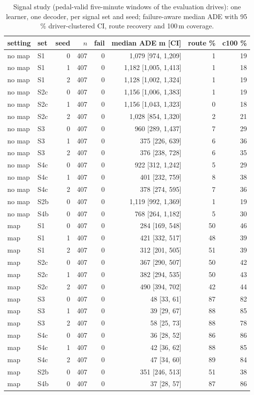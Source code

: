 \begin{table}[t]\centering\scriptsize\setlength{\tabcolsep}{3pt}
\caption{Signal study (pedal-valid five-minute windows of the evaluation drives): one learner, one decoder, per signal set and seed; failure-aware median ADE with 95\,\% driver-clustered CI, route recovery and 100\,m coverage.}\label{tab:supp_signal_sets}
\begin{tabular}{llrrrrrr}\toprule
setting & set & seed & $n$ & fail & median ADE m [CI] & route \% & c100 \% \\\midrule
no map & S1 & 0 & 407 & 0 & 1{,}079 [974, 1{,}209] & 1 & 19 \\
no map & S1 & 1 & 407 & 0 & 1{,}182 [1{,}005, 1{,}413] & 1 & 18 \\
no map & S1 & 2 & 407 & 0 & 1{,}128 [1{,}002, 1{,}324] & 1 & 19 \\
no map & S2c & 0 & 407 & 0 & 1{,}156 [1{,}006, 1{,}383] & 1 & 19 \\
no map & S2c & 1 & 407 & 0 & 1{,}156 [1{,}043, 1{,}323] & 0 & 18 \\
no map & S2c & 2 & 407 & 0 & 1{,}028 [854, 1{,}320] & 2 & 21 \\
no map & S3 & 0 & 407 & 0 & 960 [289, 1{,}437] & 7 & 29 \\
no map & S3 & 1 & 407 & 0 & 375 [226, 639] & 6 & 36 \\
no map & S3 & 2 & 407 & 0 & 376 [238, 728] & 6 & 35 \\
no map & S4c & 0 & 407 & 0 & 922 [312, 1{,}242] & 5 & 29 \\
no map & S4c & 1 & 407 & 0 & 401 [232, 759] & 8 & 38 \\
no map & S4c & 2 & 407 & 0 & 378 [274, 595] & 7 & 36 \\
no map & S2b & 0 & 407 & 0 & 1{,}119 [992, 1{,}369] & 1 & 19 \\
no map & S4b & 0 & 407 & 0 & 768 [264, 1{,}182] & 5 & 30 \\
map & S1 & 0 & 407 & 0 & 284 [169, 548] & 50 & 46 \\
map & S1 & 1 & 407 & 0 & 421 [332, 517] & 48 & 39 \\
map & S1 & 2 & 407 & 0 & 312 [201, 505] & 51 & 39 \\
map & S2c & 0 & 407 & 0 & 367 [290, 507] & 50 & 42 \\
map & S2c & 1 & 407 & 0 & 382 [294, 535] & 50 & 43 \\
map & S2c & 2 & 407 & 0 & 490 [394, 702] & 42 & 44 \\
map & S3 & 0 & 407 & 0 & 48 [33, 61] & 87 & 82 \\
map & S3 & 1 & 407 & 0 & 39 [29, 67] & 88 & 85 \\
map & S3 & 2 & 407 & 0 & 58 [25, 73] & 88 & 78 \\
map & S4c & 0 & 407 & 0 & 36 [28, 52] & 86 & 86 \\
map & S4c & 1 & 407 & 0 & 42 [36, 62] & 88 & 85 \\
map & S4c & 2 & 407 & 0 & 47 [34, 60] & 89 & 84 \\
map & S2b & 0 & 407 & 0 & 351 [246, 513] & 51 & 38 \\
map & S4b & 0 & 407 & 0 & 37 [28, 57] & 87 & 86 \\
\bottomrule\end{tabular}
\end{table}
